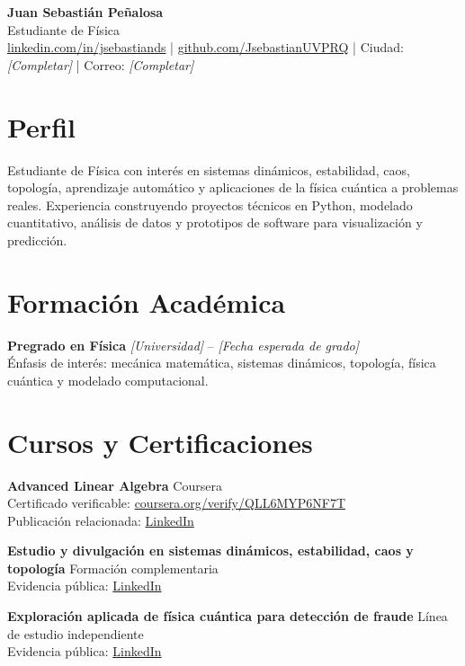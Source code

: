 \documentclass[11pt,a4paper]{article}
\newcommand{\cvitem}[2]{
    \textbf{#1} \hfill {\color{accent} #2}
}
\newcommand{\smallsep}{\vspace{0.35em}}
\begin{document}
{\Huge \textbf{Juan Sebasti\'an Pe\~nalosa}}\\[0.2em]
{\Large Estudiante de F\'isica}\\[0.4em]
\href{https://www.linkedin.com/in/jsebastiands}{linkedin.com/in/jsebastiands}
\;|\;
\href{https://github.com/JsebastianUVPRQ}{github.com/JsebastianUVPRQ}
\;|\;
Ciudad: \textit{[Completar]}
\;|\;
Correo: \textit{[Completar]}

\section*{Perfil}
Estudiante de F\'isica con inter\'es en sistemas din\'amicos, estabilidad, caos, topolog\'ia,
aprendizaje autom\'atico y aplicaciones de la f\'isica cu\'antica a problemas reales.
Experiencia construyendo proyectos t\'ecnicos en Python, modelado cuantitativo,
an\'alisis de datos y prototipos de software para visualizaci\'on y predicci\'on.

\section*{Formaci\'on Acad\'emica}
\cvitem{Pregrado en F\'isica}{\textit{[Universidad]} -- \textit{[Fecha esperada de grado]}}\\
\'Enfasis de inter\'es: mec\'anica matem\'atica, sistemas din\'amicos, topolog\'ia,
f\'isica cu\'antica y modelado computacional.

\section*{Cursos y Certificaciones}
\cvitem{Advanced Linear Algebra}{Coursera}\\
Certificado verificable:
\href{https://coursera.org/verify/QLL6MYP6NF7T}{coursera.org/verify/QLL6MYP6NF7T}\\
Publicaci\'on relacionada:
\href{https://www.linkedin.com/posts/jsebastiands_completion-certificate-for-advanced-linear-share-7438070866820812801-Mcy_}{LinkedIn}

\smallsep
\cvitem{Estudio y divulgaci\'on en sistemas din\'amicos, estabilidad, caos y topolog\'ia}{Formaci\'on complementaria}\\
Evidencia p\'ublica:
\href{https://www.linkedin.com/posts/jsebastiands_sistemas-din%C3%A1micos-estabilidad-caos-y-topolog%C3%ADa-ugcPost-7397757554304643072-07vJ}{LinkedIn}

\smallsep
\cvitem{Exploraci\'on aplicada de f\'isica cu\'antica para detecci\'on de fraude}{L\'inea de estudio independiente}\\
Evidencia p\'ublica:
\href{https://www.linkedin.com/posts/jsebastiands_puede-la-f%C3%ADsica-cu%C3%A1ntica-detectar-fraudes-ugcPost-7417032038995886080-9PmG}{LinkedIn}
\end{document}
